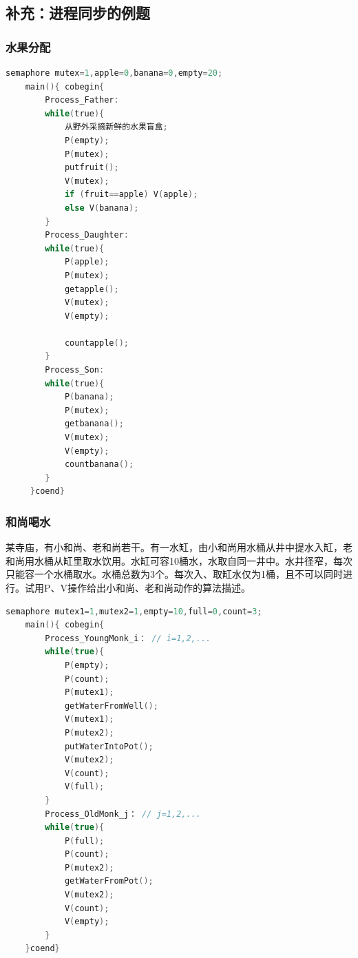 \documentclass{article}
\begin{document}
\clearpage
\subsection{\color{green}补充：进程同步的例题}
\subsubsection{水果分配}


\begin{tcolorbox}
    [colback=Emerald!10,colframe=cyan!40!black,title=\textbf{伪代码}]
    \begin{lstlisting}[language=C]
    semaphore mutex=1,apple=0,banana=0,empty=20;
    main(){ cobegin{ 
        Process_Father:
        while(true){
            从野外采摘新鲜的水果盲盒;
            P(empty);
            P(mutex);
            putfruit();
            V(mutex);
            if (fruit==apple) V(apple);
            else V(banana);
        }   
        Process_Daughter:
        while(true){
            P(apple);
            P(mutex);
            getapple();
            V(mutex);
            V(empty);
            
            countapple();
        }
        Process_Son:
        while(true){
            P(banana);
            P(mutex);
            getbanana();
            V(mutex);
            V(empty);
            countbanana();
        }
     }coend}\end{lstlisting}
\end{tcolorbox}
\clearpage
\subsubsection{和尚喝水}
某寺庙，有小和尚、老和尚若干。有一水缸，由小和尚用水桶从井中提水入缸，老和尚用水桶从缸里取水饮用。水缸可容10桶水，水取自同一井中。水井径窄，每次只能容一个水桶取水。水桶总数为3个。每次入、取缸水仅为1桶，且不可以同时进行。试用P、V操作给出小和尚、老和尚动作的算法描述。

\begin{tcolorbox}
    [colback=Emerald!10,colframe=cyan!40!black,title=\textbf{伪代码}]
    \begin{lstlisting}[language=c]
    semaphore mutex1=1,mutex2=1,empty=10,full=0,count=3;
    main(){ cobegin{ 
        Process_YoungMonk_i： // i=1,2,... 
        while(true){
            P(empty);
            P(count);
            P(mutex1);
            getWaterFromWell();
            V(mutex1);
            P(mutex2);
            putWaterIntoPot();
            V(mutex2);
            V(count);
            V(full);
        }
        Process_OldMonk_j： // j=1,2,...
        while(true){
            P(full);
            P(count);
            P(mutex2);
            getWaterFromPot();
            V(mutex2);
            V(count);
            V(empty);
        }
    }coend}\end{lstlisting}
\end{tcolorbox}
\end{document}
